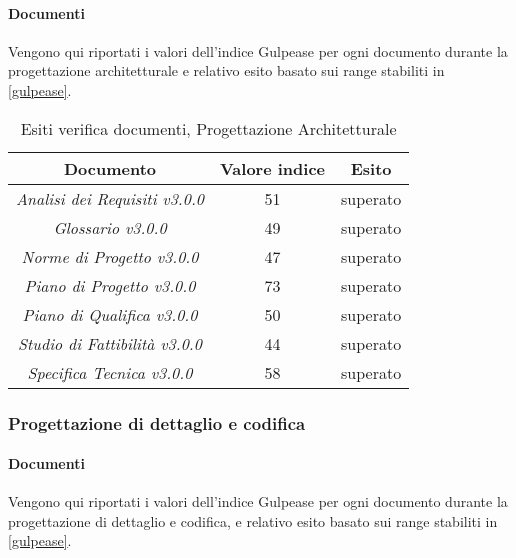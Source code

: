 	\paragraph{Documenti}
	 Vengono qui riportati i valori dell’indice Gulpease per ogni documento durante la progettazione architetturale e relativo esito basato sui range stabiliti in \ref{gulpease}.
	
	\begin{table}[H]
	\centering
	\begin{tabular}{ | c | c | c | }
    \hline
    Documento & Valore indice & Esito \\ \hline
    \emph{Analisi dei Requisiti v3.0.0} & 51 &  superato \\ \hline
    \emph{Glossario v3.0.0} & 49 &  superato \\ \hline
    \emph{Norme di Progetto v3.0.0} & 47 &  superato \\ \hline
    \emph{Piano di Progetto v3.0.0} & 73 &  superato \\ \hline
    \emph{Piano di Qualifica v3.0.0} & 50 &  superato \\ \hline
    \emph{Studio di Fattibilità v3.0.0} & 44 &  superato \\ \hline
    \emph{Specifica Tecnica v3.0.0} & 58 & superato \\ \hline
    \end{tabular}
	\caption{Esiti verifica documenti, Progettazione Architetturale}
	\end{table}
	

	\subsubsection{Progettazione di dettaglio e codifica}
	\paragraph{Documenti}
	 Vengono qui riportati i valori dell’indice Gulpease per ogni documento durante la progettazione di dettaglio e codifica, e relativo esito basato sui range stabiliti in \ref{gulpease}.
	
